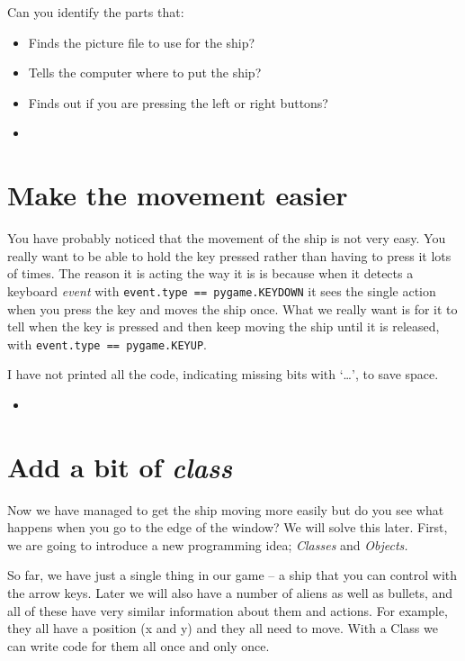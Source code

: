 \documentclass{article}
\newcommand{\pythonscript}[2]{
\begin{itemize}
\item[]
\end{itemize}
}
\newenvironment{hint}{
  \begin{tcolorbox}[colback=green!5,colframe=green!40!black,title=Note]}
{\end{tcolorbox}}
\begin{document}
\begin{hint}
Can you identify the parts that:

\begin{itemize}
  \item Finds the picture file to use for the ship?
  \item Tells the computer where to put the ship?
  \item Finds out if you are pressing the left or right buttons?
\end{itemize}
\end{hint}

\pythonscript{controls}{Controlling the ship}

\section{Make the movement easier}

You have probably noticed that the movement of the ship is not very easy. You
really want to be able to hold the key pressed rather than having to press it
lots of times. The reason it is acting the way it is is because when it
detects a keyboard \emph{event} with \texttt{event.type == pygame.KEYDOWN} it sees
the single action when you press the key and moves the ship once. What we
really want is for it to tell when the key is pressed and then keep moving
the ship until it is released, with \texttt{event.type == pygame.KEYUP}.

\begin{hint}
I have not printed all the code, indicating missing bits with `\ldots', to save
space.
\end{hint}

\pythonscript{smoothcontrol}{Easier control of the ship}

\section{Add a bit of \emph{class}}

Now we have managed to get the ship moving more easily but do you see what
happens when you go to the edge of the window? We will solve this later.
First, we are going to introduce a new
programming idea; \emph{Classes} and \emph{Objects.}

So far, we have just a single thing in our game -- a ship that you can control
with the arrow keys. Later we will also have a number of aliens as well as
bullets, and all of these have very similar information about them and actions.
For example, they all have a position (x and y) and they all need to move.
With a Class we can write code for them all once and only once.
\end{document}
